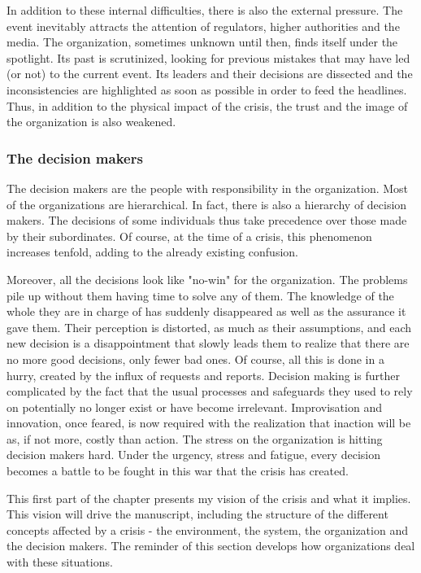 In addition to these internal difficulties, there is also the external pressure.
The event inevitably attracts the attention of regulators, higher authorities and the media.
The organization, sometimes unknown until then, finds itself under the spotlight.
Its past is scrutinized, looking for previous mistakes that may have led (or not) to the current event.
Its leaders and their decisions are dissected and the inconsistencies are highlighted as soon as possible in order to feed the headlines.
Thus, in addition to the physical impact of the crisis, the trust and the image of the organization is also weakened.

\subsubsection{The decision makers}
The decision makers are the people with responsibility in the organization.
Most of the organizations are hierarchical.
In fact, there is also a hierarchy of decision makers.
The decisions of some individuals thus take precedence over those made by their subordinates.
Of course, at the time of a crisis, this phenomenon increases tenfold, adding to the already existing confusion.

Moreover, all the decisions look like "no-win" for the organization.
The problems pile up without them having time to solve any of them.
The knowledge of the whole they are in charge of has suddenly disappeared as well as the assurance it gave them.
Their perception is distorted, as much as their assumptions, and each new decision is a disappointment that slowly leads them to realize that there are no more good decisions, only fewer bad ones.
Of course, all this is done in a hurry, created by the influx of requests and reports.
Decision making is further complicated by the fact that the usual processes and safeguards they used to rely on potentially no longer exist or have become irrelevant.
Improvisation and innovation, once feared, is now required with the realization that inaction will be as, if not more, costly than action.
The stress on the organization is hitting decision makers hard.
Under the urgency, stress and fatigue, every decision becomes a battle to be fought in this war that the crisis has created.

This first part of the chapter presents my vision of the crisis and what it implies.
This vision will drive the manuscript, including the structure of the different concepts affected by a crisis - the environment, the system, the organization and the decision makers.
The reminder of this section develops how organizations deal with these situations.

